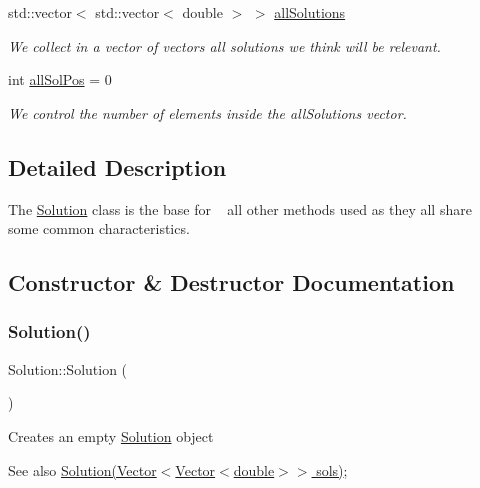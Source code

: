 \begin{DoxyCompactItemize}
\mbox{\label{class_solution_a09fa8d2538a87e8d9cba2ee682f729ac}} 
std\+::vector$<$ std\+::vector$<$ double $>$ $>$ \hyperlink{class_solution_a09fa8d2538a87e8d9cba2ee682f729ac}{all\+Solutions}
\begin{DoxyCompactList}\small\item\em We collect in a vector of vectors all solutions we think will be relevant. \end{DoxyCompactList}\item 
\mbox{\label{class_solution_af933662f6d08824b37f315fc36678c3b}} 
int \hyperlink{class_solution_af933662f6d08824b37f315fc36678c3b}{all\+Sol\+Pos} = 0
\begin{DoxyCompactList}\small\item\em We control the number of elements inside the all\+Solutions vector. \end{DoxyCompactList}\end{DoxyCompactItemize}


\subsection{Detailed Description}
The \hyperlink{class_solution}{Solution} class is the base for ~\newline
 all other methods used as they all share ~\newline
 some common characteristics. 

\subsection{Constructor \& Destructor Documentation}
\mbox{\label{class_solution_ab55bd4b023d596ce11aaf737b9a6123b}} 
\subsubsection{\texorpdfstring{Solution()}{Solution()}\hspace{0.1cm}{\footnotesize\ttfamily [1/2]}}
{\footnotesize\ttfamily Solution\+::\+Solution (\begin{DoxyParamCaption}{ }\end{DoxyParamCaption})}

Creates an empty \hyperlink{class_solution}{Solution} object \begin{DoxySeeAlso}{See also}
\hyperlink{class_solution}{Solution(\+Vector$<$\+Vector$<$double$>$$>$ sols)}; 
\end{DoxySeeAlso}
\mbox{\label{class_solution_acd2b9ac1b6ddd327ece034d99fc9cfdd}} 
